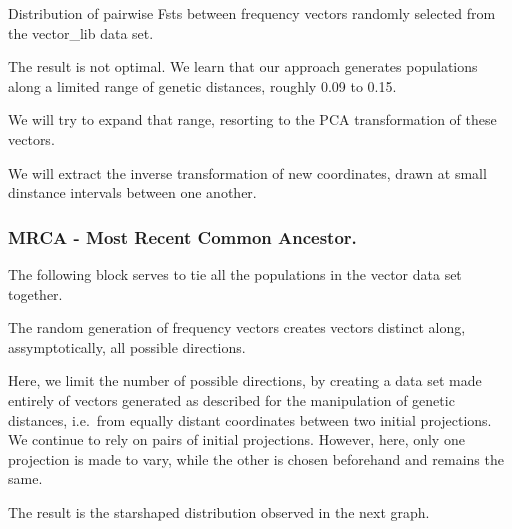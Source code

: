 \documentclass[11pt]{article}
\begin{document}
    
    
    Distribution of pairwise Fsts between frequency vectors randomly
selected from the vector\_lib data set.

The result is not optimal. We learn that our approach generates
populations along a limited range of genetic distances, roughly 0.09 to
0.15.

We will try to expand that range, resorting to the PCA transformation of
these vectors.

We will extract the inverse transformation of new coordinates, drawn at
small dinstance intervals between one another.

    \hypertarget{mrca---most-recent-common-ancestor.}{%
\subsubsection{MRCA - Most Recent Common
Ancestor.}\label{mrca---most-recent-common-ancestor.}}

The following block serves to tie all the populations in the vector data
set together.

The random generation of frequency vectors creates vectors distinct
along, assymptotically, all possible directions.

Here, we limit the number of possible directions, by creating a data set
made entirely of vectors generated as described for the manipulation of
genetic distances, i.e.~from equally distant coordinates between two
initial projections. We continue to rely on pairs of initial
projections. However, here, only one projection is made to vary, while
the other is chosen beforehand and remains the same.

The result is the starshaped distribution observed in the next graph.
\end{document}
